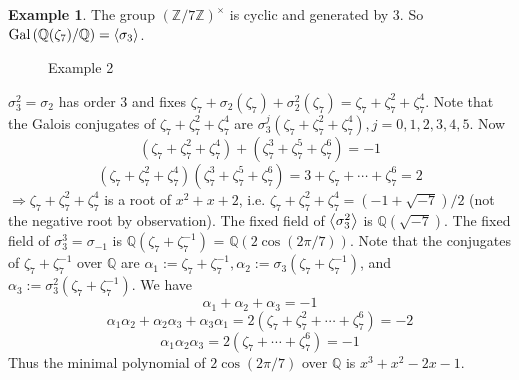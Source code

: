 \documentclass{article}
\theoremstyle{definition}
\newtheorem{ex}{Example}
\newcommand{\QQ}{\mathbb Q}
\newcommand{\ZZ}{\mathbb Z}
\newcommand{\Ra}{\Rightarrow}
\newcommand{\Gal}{\text{Gal}\,}
\begin{document}
\begin{ex}
	The group $(\ZZ/7 \ZZ)^\times$ is cyclic and generated by $3$.
	So $\Gal(\QQ(\zeta_7)/\QQ) = \ev{\sigma_3}$.


	\begin{figure}[H]
		\centering
		\caption{Example 2}
	\end{figure}

	$\sigma_3^2 = \sigma_2$ has order $3$ and fixes $\zeta_7 + \sigma_2 (\zeta_7) + \sigma_2^2 (\zeta_7) = \zeta_7 + \zeta_7^2 + \zeta_7^4$.
	Note that the Galois conjugates of $\zeta_7 + \zeta_7^2 + \zeta_7^4$ are $\sigma_3^j(\zeta_7 + \zeta_7^2 + \zeta_7^4), j = 0, 1, 2, 3, 4, 5$.
	Now 
	\[
		(\zeta_7 + \zeta_7^2 + \zeta_7^4) + (\zeta_7^3 + \zeta_7^5 + \zeta_7^6) = -1
	\]
	\[
		(\zeta_7 + \zeta_7^2 + \zeta_7^4) (\zeta_7^3 + \zeta_7^5 + \zeta_7^6) = 3 + \zeta_7 + \cdots + \zeta_7^6 = 2
	\]
	$\Ra \zeta_7 + \zeta_7^2 + \zeta_7^4$ is a root of $x^2 + x + 2$, i.e. $\zeta_7 + \zeta_7^2 + \zeta_7^4= (-1 + \sqrt{-7})/2$ (not the negative root by observation).
	The fixed field of $\ev{\sigma_3^2}$ is $\QQ(\sqrt{-7})$.
	The fixed field of $\sigma_3^3 = \sigma_{-1}$ is $\QQ(\zeta_7 + \zeta_7^{-1})$ = $\QQ(2 \cos(2 \pi/7))$.
	Note that the conjugates of $\zeta_7 + \zeta_7^{-1}$ over $\QQ$ are $\alpha_1 := \zeta_7 + \zeta_7^{-1}, \alpha_2 := \sigma_3 (\zeta_7 + \zeta_7^{-1})$, and $\alpha_3 := \sigma_3^2 (\zeta_7 + \zeta_7^{-1})$.
	We have
	\[
		\alpha_1 + \alpha_2 + \alpha_3 = -1
	\]
	\[
		\alpha_1 \alpha_2 + \alpha_2 \alpha_3 + \alpha_3 \alpha_1 = 2 (\zeta_7 + \zeta_7^2 + \cdots + \zeta_7^6) = -2
	\]
	\[
		\alpha_1 \alpha_2 \alpha_3 = 2 ( \zeta_7 + \cdots + \zeta_7^6) = -1
	\]
	Thus the minimal polynomial of $2 \cos (2 \pi/7)$ over $\QQ$ is $x^3 + x^2 - 2x - 1$.
\end{ex}
\end{document}
